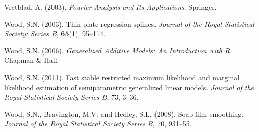 \documentclass[useAMS,referee]{biom}
\begin{document}
\begin{thebibliography}{99}
\bibitem{} Vretblad, A. (2003). \textit{Fourier Analysis and Its Applications}. Springer.

\bibitem{} Wood, S.N. (2003). Thin plate regression splines. \textit{Journal of the Royal Statistical Society: Series B}, \textbf{65}(1), 95--114.

\bibitem{} Wood, S.N. (2006). \textit{Generalized Additive Models: An Introduction with R}. Chapman \& Hall.

\bibitem{} Wood, S.N. (2011). Fast stable restricted maximum likelihood and marginal likelihood estimation of semiparametric generalized linear models. \textit{Journal of the Royal Statistical Society Series B}, 73, 3--36.

\bibitem{} Wood, S.N., Bravington, M.V. and Hedley, S.L. (2008). Soap film smoothing. \textit{Journal of the Royal Statistical Society Series B}, 70, 931--55.

\end{thebibliography}


\label{lastpage}
\end{document}
